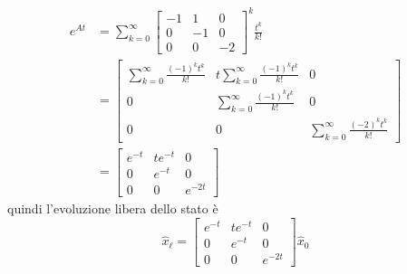 \documentclass{article}
\begin{document}
\begin{align*}
    e^{\hat A t} &= \sum_{k=0}^\infty \begin{bmatrix}
        -1 & 1 & 0\\
        0 & -1 & 0\\
        0 & 0 & -2
    \end{bmatrix}^k \frac{t^k}{k!}\\
    &= \begin{bmatrix}
        \sum\limits_{k=0}^\infty \frac{(-1)^k t^k}{k!} & t \sum\limits_{k=0}^\infty \frac{(-1)^k t^k}{k!} & 0\\
        0 & \sum\limits_{k=0}^\infty \frac{(-1)^k t^k}{k!} & 0\\
        0 & 0 & \sum\limits_{k=0}^\infty \frac{(-2)^k t^k}{k!}
    \end{bmatrix}\\
    &= \begin{bmatrix}
        e^{-t} & te^{-t} & 0\\
        0 & e^{-t} & 0\\
        0 & 0 & e^{-2t}
    \end{bmatrix}
\end{align*}
quindi l'evoluzione libera dello stato è
\[
    \hat x_\ell = 
    \begin{bmatrix}
        e^{-t} & te^{-t} & 0\\
        0 & e^{-t} & 0\\
        0 & 0 & e^{-2t}
    \end{bmatrix} \hat x_0
\]
\end{document}
